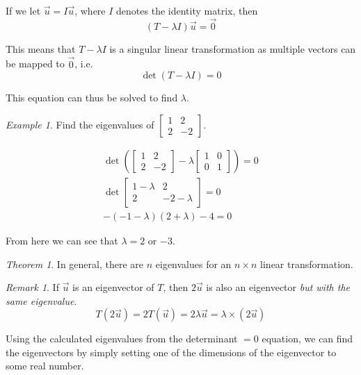 \documentclass[a4paper]{article}
\theoremstyle{remark}
\newtheorem*{remark}{Remark}
\newtheorem{example}{Example}
\theoremstyle{theorem}
\newtheorem{theorem}{Theorem}
\begin{document}
If we let $\vec{u} = I\vec{u}$, where $I$ denotes the identity matrix, then
\begin{equation}
	(T-\lambda I)\vec{u} = \vec{0}
\end{equation}

This means that $T-\lambda I$ is a singular linear transformation as multiple vectors can be mapped to $\vec{0}$, i.e. 
\begin{equation}
	\det{(T-\lambda I)} = 0
\end{equation}

This equation can thus be solved to find $\lambda$.

\begin{example}
	Find the eigenvalues of $\begin{bmatrix} 1 & 2 \\ 2 & -2\end{bmatrix}$.

	\begin{align}
		\det{(\begin{bmatrix} 1 & 2 \\ 2 & -2\end{bmatrix} - \lambda\begin{bmatrix} 1 & 0 \\ 0 & 1\end{bmatrix})} = 0 \\
		\det{\begin{bmatrix} 1-\lambda & 2 \\ 2 & -2-\lambda\end{bmatrix}} = 0 \\
		-(-1-\lambda)(2+\lambda) - 4 = 0
	\end{align}

	From here we can see that $\lambda = 2$ or $-3$.
\end{example}

\begin{theorem}
	In general, there are $n$ eigenvalues for an $n\times n$ linear transformation.
\end{theorem}

\begin{remark}
	If $\vec{u}$ is an eigenvector of $T$, then $2\vec{u}$ is also an eigenvector \emph{but with the same eigenvalue}.
	\begin{equation}
		T(2\vec{u}) = 2T(\vec{u}) = 2\lambda\vec{u} = \lambda\times(2\vec{u})
	\end{equation}
\end{remark}

Using the calculated eigenvalues from the determinant $=0$ equation, we can find the eigenvectors by simply setting one of the dimensions of the eigenvector to some real number.
\end{document}
